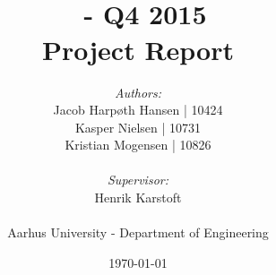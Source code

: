 \documentclass[11pt]{article}
\title{
	{\Huge \courseTitle \\}
	\bigskip
	\courseCode\ - Q4 2015 \\
	\medskip
	Project Report
	}
\author{
	\emph{Authors:}\\
	Jacob Harpøth Hansen | 10424\\
	Kasper Nielsen | 10731\\
	Kristian Mogensen | 10826\\
	\-\\
	\emph{Supervisor:}\\
	Henrik Karstoft\\
	\-\\
	Aarhus University - Department of Engineering}
\date{\today} %
\begin{document}
\maketitle	%
\listoffixmes %

\newpage			%
\tableofcontents	%

\newpage
 

\newpage
 

\newpage
 

\newpage
 

\newpage
 

\newpage
% 



% 
\end{document}
